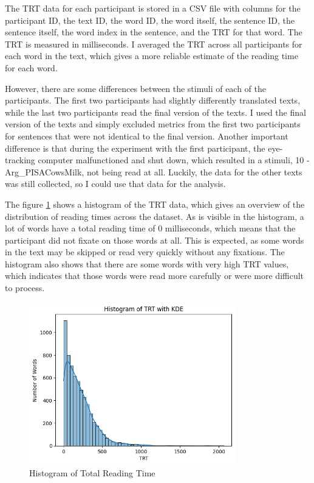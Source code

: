The TRT data for each participant is stored in a CSV file with columns for the participant ID, the text ID, the word ID, the word itself, the sentence ID, the sentence itself, the word index in the sentence, and the TRT for that word. The TRT is measured in milliseconds. I averaged the TRT across all participants for each word in the text, which gives a more reliable estimate of the reading time for each word. 

However, there are some differences between the stimuli of each of the participants. The first two participants had slightly differently translated texts, while the last two participants read the final version of the texts. I used the final version of the texts and simply excluded metrics from the first two participants for sentences that were not identical to the final version. Another important difference is that during the experiment with the first participant, the eye-tracking computer malfunctioned and shut down, which resulted in a stimuli, 10 - Arg\_PISACowsMilk, not being read at all. Luckily, the data for the other texts was still collected, so I could use that data for the analysis.

The figure \ref{fig:trt_data} shows a histogram of the TRT data, which gives an overview of the distribution of reading times across the dataset. As is visible in the histogram, a lot of words have a total reading time of 0 milliseconds, which means that the participant did not fixate on those words at all. This is expected, as some words in the text may be skipped or read very quickly without any fixations. The histogram also shows that there are some words with very high TRT values, which indicates that those words were read more carefully or were more difficult to process.

\begin{figure}
    \centering
    \includegraphics[width=0.8\textwidth]{images/TRT_histogram_KDE.png}
    \caption{Histogram of Total Reading Time}
    \label{fig:trt_data}
\end{figure}